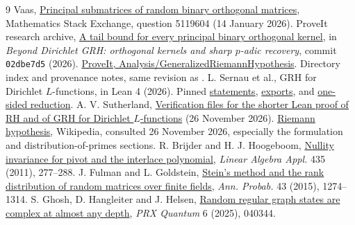 \documentclass[11pt]{article}
\theoremstyle{remark}\newtheorem*{remark}{Remark}
\begin{document}
\clearpage
\begin{thebibliography}{9}
 Vaas, \href{https://math.stackexchange.com/questions/5119604/principal-submatrices-of-random-binary-orthogonal-matrices}{Principal submatrices of random binary orthogonal matrices}, Mathematics Stack Exchange, question 5119604 (14 January 2026).
 ProveIt research archive, \href{https://github.com/VladimirReshetnikov/ProveIt/blob/02dbe7d5754f1e0b6879185e60302813738de756/Analysis/GeneralizedRiemannHypothesis/Research/grh_method_transfers_orthogonal_jets_2026-11-26/sections/binary.tex}{A tail bound for every principal binary orthogonal kernel}, in \emph{Beyond Dirichlet GRH: orthogonal kernels and sharp $p$-adic recovery}, commit \texttt{02dbe7d5} (2026).
 \href{https://github.com/VladimirReshetnikov/ProveIt/tree/02dbe7d5754f1e0b6879185e60302813738de756/Analysis/GeneralizedRiemannHypothesis}{ProveIt, Analysis/GeneralizedRiemannHypothesis}. Directory index and provenance notes, same revision as \cite{prev}.
 L. Sernau et al., GRH for Dirichlet $L$-functions, in Lean 4 (2026). Pinned \href{https://github.com/lsernau/grh-lean/blob/72fead102f663d5c7a407964a13dc0cf9d977207/grh/src/Statements.lean}{statements}, \href{https://github.com/lsernau/grh-lean/blob/72fead102f663d5c7a407964a13dc0cf9d977207/grh/src/Main.lean}{exports}, and \href{https://github.com/lsernau/grh-lean/blob/72fead102f663d5c7a407964a13dc0cf9d977207/grh/src/New/Reduction/OneSidedBound.lean}{one-sided reduction}.
 A. V. Sutherland, \href{https://math.mit.edu/~drew/shortgrh/}{Verification files for the shorter Lean proof of RH and of GRH for Dirichlet $L$-functions} (26 November 2026).
 \href{https://en.wikipedia.org/wiki/Riemann_hypothesis}{Riemann hypothesis}, Wikipedia, consulted 26 November 2026, especially the formulation and distribution-of-primes sections.
 R. Brijder and H. J. Hoogeboom, \href{https://arxiv.org/abs/0912.0878}{Nullity invariance for pivot and the interlace polynomial}, \emph{Linear Algebra Appl.} 435 (2011), 277--288.
 J. Fulman and L. Goldstein, \href{https://arxiv.org/abs/1211.0504}{Stein's method and the rank distribution of random matrices over finite fields}, \emph{Ann. Probab.} 43 (2015), 1274--1314.
 S. Ghosh, D. Hangleiter and J. Helsen, \href{https://doi.org/10.1103/52xz-3hpc}{Random regular graph states are complex at almost any depth}, \emph{PRX Quantum} 6 (2025), 040344.
\end{thebibliography}
\end{document}
